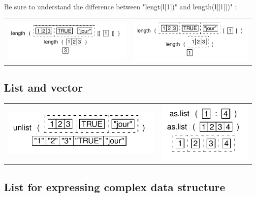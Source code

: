 \documentclass[pdflatex]{article}
\begin{document}
Be sure to understand the difference between "lengt(l[1])" and length(l[[1]])" :

\begin{tabular}{cc}
\includegraphics{list_extraction_1.pdf} & \includegraphics{list_extraction_2.pdf}
\end{tabular}

\subsection{List and vector}

\begin{tabular}{cc}
\includegraphics{unlist} & \includegraphics{aslist}
\end{tabular}

\subsection{List for expressing complex data structure}
\end{document}
